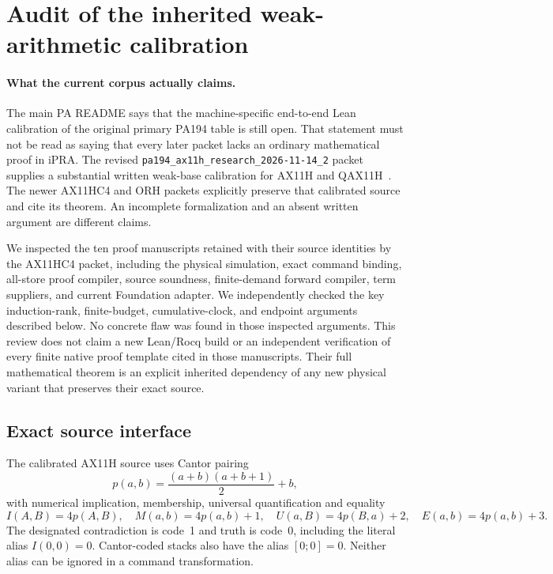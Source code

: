 \section{Audit of the inherited weak-arithmetic calibration}
\label{sec:inherited-calibration-audit}

\paragraph{What the current corpus actually claims.}
The main PA README says that the machine-specific end-to-end Lean
calibration of the original primary PA194 table is still open.  That
statement must not be read as saying that every later packet lacks an
ordinary mathematical proof in iPRA.  The revised
\texttt{pa194\_ax11h\_research\_2026-11-14\_2} packet supplies a substantial
written weak-base calibration for AX11H and QAX11H~\cite{ax11h}.  The newer AX11HC4 and
ORH packets explicitly preserve that calibrated source and cite its theorem.
An incomplete formalization and an absent written argument are different
claims.

We inspected the ten proof manuscripts retained with their source identities
by the AX11HC4 packet, including the physical simulation, exact command
binding, all-store proof compiler, source soundness, finite-demand forward
compiler, term suppliers, and current Foundation adapter.  We independently
checked the key induction-rank, finite-budget, cumulative-clock, and endpoint
arguments described below.  No concrete flaw was found in those inspected
arguments.  This review does not claim a new Lean/Rocq build or an independent
verification of every finite native proof template cited in those manuscripts.
Their full mathematical theorem is an explicit inherited dependency of any
new physical variant that preserves their exact source.

\subsection{Exact source interface}

The calibrated AX11H source uses Cantor pairing
\[
 p(a,b)=\frac{(a+b)(a+b+1)}2+b,
\]
with numerical implication, membership, universal quantification and equality
\[
 I(A,B)=4p(A,B),\quad M(a,b)=4p(a,b)+1,\quad
 U(a,B)=4p(B,a)+2,\quad E(a,b)=4p(a,b)+3.
\]
The designated contradiction is code~1 and truth is code~0, including the
literal alias $I(0,0)=0$.  Cantor-coded stacks also have the alias $[0;0]=0$.
Neither alias can be ignored in a command transformation.

